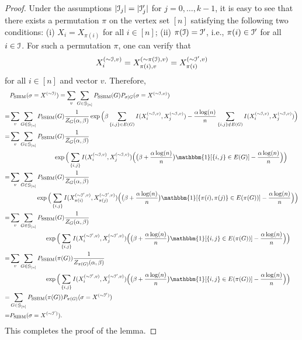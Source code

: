 \documentclass{article}
\begin{document}
\begin{proof}
Under the assumptions $|\mathcal{I}_j|=|\mathcal{I}_j'|$ for $j=0, \dots, k-1$,
it is easy to see that there exists a permutation $\pi$ on the vertex set $[n]$ satisfying the following two conditions: 
(i) $X_i=X_{\pi(i)}$ for all $i\in[n]$; 
(ii) $\pi(\mathcal{I})=\mathcal{I}'$, i.e., $\pi(i)\in\mathcal{I}'$ for all $i\in\mathcal{I}$.
For such a permutation $\pi$, one can verify that
$$
X_i^{(\sim\mathcal{I}, v)} = X_{\pi(i), v}^{(\sim\pi(\mathcal{I}), v)}
= X_{\pi(i)}^{(\sim \mathcal{I}', v)}
$$
for all $i\in[n]$ and vector $v$.
Therefore,
\begin{align*}
& P_{\SIBM}(\sigma=X^{(\sim\cI)})
=\sum_{v}\sum_{G\in\cG_{[n]}}
P_{\SSBM}(G) P_{\sigma|G}(\sigma=X^{(\sim\cI, v)}) \\
= & \sum_{v}\sum_{G\in\cG_{[n]}} P_{\SSBM}(G) \frac{1}{Z_G(\alpha,\beta)}
\exp\Big(\beta\sum_{\{i,j\}\in E(G)} I(X_i^{(\sim\cI,v)},X_j^{(\sim\cI,v)})
-\frac{\alpha\log(n)}{n} \sum_{\{i,j\}\notin E(G)}  I(X_i^{(\sim\cI,v)},X_j^{(\sim\cI,v)}) \Big)  \\
= & \sum_{v}\sum_{G\in\cG_{[n]}} P_{\SSBM}(G) \frac{1}{Z_G(\alpha,\beta)}  \\
& \hspace*{1in}
\exp\Big(\sum_{\{i,j\}} I(X_i^{(\sim\cI,v)},X_j^{(\sim\cI,v)})
\Big( \big( \beta+\frac{\alpha\log(n)}{n} \big) \mathbbm{1}[\{i,j\}\in E(G)]
-\frac{\alpha\log(n)}{n} \Big)
 \Big)  \\
= &\sum_v \sum_{G\in\cG_{[n]}} P_{\SSBM}(G) \frac{1}{Z_G(\alpha,\beta)}  \\
& \hspace*{0.6in}
\exp\Big(\sum_{\{i,j\}} I(X_{\pi(i)}^{(\sim \cI',v)}, X_{\pi(j)}^{(\sim \cI',v)})
\Big( \big( \beta+\frac{\alpha\log(n)}{n} \big) \mathbbm{1}[\{\pi(i),\pi(j)\}\in E(\pi(G))]
-\frac{\alpha\log(n)}{n} \Big)
 \Big)   \\
 = &\sum_v  \sum_{G\in\cG_{[n]}} P_{\SSBM}(G) \frac{1}{Z_G(\alpha,\beta)}  \\
& \hspace*{0.8in}
\exp\Big(\sum_{\{i,j\}} I(X_i^{(\sim \cI',v)}, X_j^{(\sim \cI',v)})
\Big( \big( \beta+\frac{\alpha\log(n)}{n} \big) \mathbbm{1}[\{i, j\}\in E(\pi(G))]
-\frac{\alpha\log(n)}{n} \Big)
 \Big)   \\
  = &\sum_v \sum_{G\in\cG_{[n]}} P_{\SSBM}(\pi(G)) \frac{1}{Z_{\pi(G)}(\alpha,\beta)}  \\
& \hspace*{0.8in}
\exp\Big(\sum_{\{i,j\}} I(X_i^{(\sim \cI',v)}, X_j^{(\sim \cI',v)})
\Big( \big( \beta+\frac{\alpha\log(n)}{n} \big) \mathbbm{1}[\{i, j\}\in E(\pi(G))]
-\frac{\alpha\log(n)}{n} \Big)
 \Big)  \\
= & \sum_{G\in\cG_{[n]}}
P_{\SSBM}(\pi(G)) P_{\pi(G)}(\sigma=X^{(\sim\cI')}) \\
= & P_{\SIBM}(\sigma=X^{(\sim\cI')}) .
\end{align*}
This completes the proof of the lemma.
\end{proof}
\end{document}
